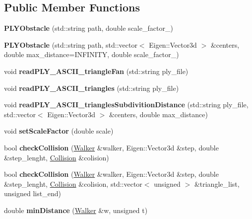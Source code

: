 \subsection*{Public Member Functions}
\begin{DoxyCompactItemize}
\item 
\mbox{\label{class_p_l_y_obstacle_a8995508a44982787e9aa44bc8d47f669}} 
{\bfseries P\+L\+Y\+Obstacle} (std\+::string path, double scale\+\_\+factor\+\_)
\item 
\mbox{\label{class_p_l_y_obstacle_a52649eb1362242e7681e75f7409ee940}} 
{\bfseries P\+L\+Y\+Obstacle} (std\+::string path, std\+::vector$<$ Eigen\+::\+Vector3d $>$ \&centers, double max\+\_\+distance=I\+N\+F\+I\+N\+I\+TY, double scale\+\_\+factor\+\_)
\item 
\mbox{\label{class_p_l_y_obstacle_a4e409be3ded2cb3fe2f3cae97fafd266}} 
void {\bfseries read\+P\+L\+Y\+\_\+\+A\+S\+C\+I\+I\+\_\+triangle\+Fan} (std\+::string ply\+\_\+file)
\item 
\mbox{\label{class_p_l_y_obstacle_af5db9263d9555682f8345cef2d116eb4}} 
void {\bfseries read\+P\+L\+Y\+\_\+\+A\+S\+C\+I\+I\+\_\+triangles} (std\+::string ply\+\_\+file)
\item 
\mbox{\label{class_p_l_y_obstacle_a428018f72231740be297c9cd24752bbd}} 
void {\bfseries read\+P\+L\+Y\+\_\+\+A\+S\+C\+I\+I\+\_\+triangles\+Subdivition\+Distance} (std\+::string ply\+\_\+file, std\+::vector$<$ Eigen\+::\+Vector3d $>$ \&centers, double max\+\_\+distance)
\item 
\mbox{\label{class_p_l_y_obstacle_ad0ce0257b8250a5e325da3f0d58e90de}} 
void {\bfseries set\+Scale\+Factor} (double scale)
\item 
\mbox{\label{class_p_l_y_obstacle_aa43eb5a352acb2305b0ad5d4f3535dd1}} 
bool {\bfseries check\+Collision} (\hyperlink{class_walker}{Walker} \&walker, Eigen\+::\+Vector3d \&step, double \&step\+\_\+lenght, \hyperlink{class_collision}{Collision} \&colision)
\item 
\mbox{\label{class_p_l_y_obstacle_ada5a479826a277b78f7531693809e69c}} 
bool {\bfseries check\+Collision} (\hyperlink{class_walker}{Walker} \&walker, Eigen\+::\+Vector3d \&step, double \&step\+\_\+lenght, \hyperlink{class_collision}{Collision} \&colision, std\+::vector$<$ unsigned $>$ \&triangle\+\_\+list, unsigned list\+\_\+end)
\item 
\mbox{\label{class_p_l_y_obstacle_aef64d5d9c5ea9d16c0efb75b89dc7ba0}} 
double {\bfseries min\+Distance} (\hyperlink{class_walker}{Walker} \&w, unsigned t)
\end{DoxyCompactItemize}
